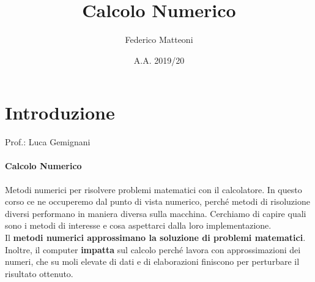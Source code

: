 \documentclass[10pt]{book}
\begin{document}
\renewcommand*\contentsname{Indice}
\title{Calcolo Numerico}
\author{Federico Matteoni}
\date{A.A. 2019/20}
\maketitle
\tableofcontents
\pagebreak
\section*{Introduzione}
Prof.: Luca Gemignani
\paragraph{Calcolo Numerico} Metodi numerici per risolvere problemi matematici con il calcolatore. In questo corso ce ne occuperemo dal punto di vista numerico, perché metodi di risoluzione diversi performano in maniera diversa sulla macchina. Cerchiamo di capire quali sono i metodi di interesse e cosa aspettarci dalla loro implementazione.\\
Il \textbf{metodi numerici approssimano la soluzione di problemi matematici}.\\
Inoltre, il computer \textbf{impatta} sul calcolo perché lavora con approssimazioni dei numeri, che su moli elevate di dati e di elaborazioni finiscono per perturbare il risultato ottenuto.
\end{document}
